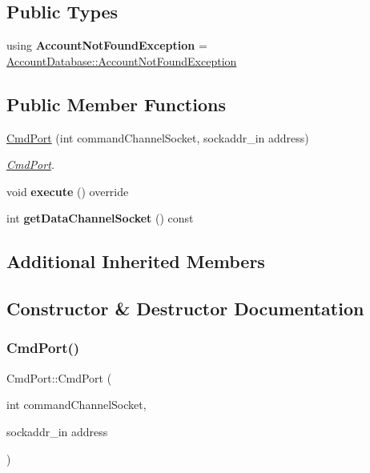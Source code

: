 \subsection*{Public Types}
\begin{DoxyCompactItemize}
\item 
\mbox{\label{classCmdPort_a52b57e3d2984f4198fdbcb235e46509e}} 
using {\bfseries Account\+Not\+Found\+Exception} = \hyperlink{structAccountDatabase_1_1AccountNotFoundException}{Account\+Database\+::\+Account\+Not\+Found\+Exception}
\end{DoxyCompactItemize}
\subsection*{Public Member Functions}
\begin{DoxyCompactItemize}
\item 
\hyperlink{classCmdPort_a81f0136aa4cd9364e5998fffd703876f}{Cmd\+Port} (int command\+Channel\+Socket, sockaddr\+\_\+in address)
\begin{DoxyCompactList}\small\item\em \hyperlink{classCmdPort}{Cmd\+Port}. \end{DoxyCompactList}\item 
\mbox{\label{classCmdPort_a3b43d863b32447013c0e8ae5b7035914}} 
void {\bfseries execute} () override
\item 
\mbox{\label{classCmdPort_abbe13bd8440f5cbf0c16aa0bff57d4ad}} 
int {\bfseries get\+Data\+Channel\+Socket} () const
\end{DoxyCompactItemize}
\subsection*{Additional Inherited Members}


\subsection{Constructor \& Destructor Documentation}
\mbox{\label{classCmdPort_a81f0136aa4cd9364e5998fffd703876f}} 
\subsubsection{\texorpdfstring{Cmd\+Port()}{CmdPort()}}
{\footnotesize\ttfamily Cmd\+Port\+::\+Cmd\+Port (\begin{DoxyParamCaption}\item[{int}]{command\+Channel\+Socket,  }\item[{sockaddr\+\_\+in}]{address }\end{DoxyParamCaption})}



